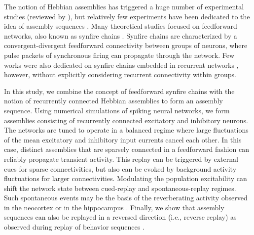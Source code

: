   The notion of Hebbian assemblies has triggered a huge number of experimental
  studies (reviewed by \citealp{Wallace2010}), but relatively few experiments have
  been dedicated to the idea of assembly sequences \citep{Kruskal2013,
  Almeida2014}. Many theoretical studies focused on feedforward networks,
  also known as synfire chains \citep{Abeles1991, Diesmann1999, Aviel2002,
  Jahnke2013}. Synfire chains are characterized by a convergent-divergent
  feedforward connectivity between groups of neurons, where pulse packets of
  synchronous firing can propagate through the network. Few works were also
  dedicated on synfire chains embedded in recurrent networks \citep{Aviel2003,
  Kumar2008, Trengove2013}, however, without explicitly considering recurrent
  connectivity within groups.

  In this study, we combine the concept of feedforward synfire chains with the
  notion of recurrently connected Hebbian assemblies to form an assembly
  sequence. Using numerical simulations of spiking neural networks, we form
  assemblies consisting of recurrently connected excitatory and inhibitory
  neurons. The networks are tuned to operate in a balanced regime where large
  fluctuations of the mean excitatory and inhibitory input currents cancel each
  other. In this case, distinct assemblies that are sparsely connected in a
  feedforward fashion can reliably propagate transient activity. This replay
  can be triggered by external cues for sparse connectivities, but also can be
  evoked by background activity fluctuations for larger connectivities.
  Modulating the population excitability can shift the network state between
  cued-replay and spontaneous-replay regimes.
  Such spontaneous events may be the basis of the reverberating activity
  observed in the neocortex \citep{Kenet2003, Luczak2009, Contreras2013} or in
  the hippocampus \citep{Lee2002, Dragoi2013, Stark2015}. Finally, we show
  that assembly sequences can also be replayed in a reversed direction (i.e.,
  reverse replay) as observed during replay of behavior sequences
  \citep{Foster2006, Diba2007}. 


